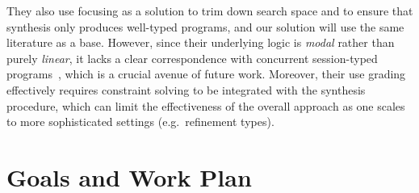 \documentclass{llncs}
\begin{document}
They also use focusing as a solution to trim down search space and
to ensure that synthesis only produces well-typed programs, and
our solution will use the same literature as a base.  However, since
their underlying logic is \emph{modal} rather than purely
\emph{linear}, it lacks a clear correspondence with concurrent
session-typed programs~\cite{}, which is a crucial avenue of future
work. Moreover, their use grading effectively requires constraint solving to
be integrated with the synthesis procedure, which can limit the
effectiveness of the overall approach as one scales to more
sophisticated settings (e.g.~refinement types).


  







\section{Goals and Work Plan}
\end{document}
